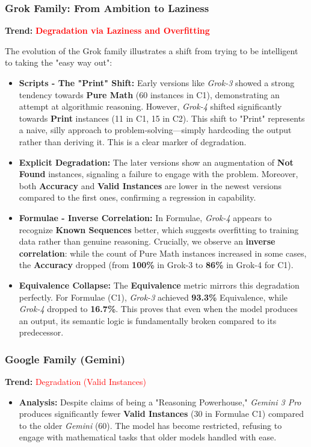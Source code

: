 \subsubsection{Grok Family: From Ambition to Laziness}
\textbf{Trend:} \textcolor{red}{\textbf{Degradation via Laziness and Overfitting}}

The evolution of the Grok family illustrates a shift from trying to be intelligent to taking the "easy way out":

\begin{itemize}
    \item \textbf{Scripts - The "Print" Shift:} 
    Early versions like \textit{Grok-3} showed a strong tendency towards \textbf{Pure Math} (60 instances in C1), demonstrating an attempt at algorithmic reasoning. However, \textit{Grok-4} \cite{xAI2025Grok4} shifted significantly towards \textbf{Print} instances (11 in C1, 15 in C2). This shift to "Print" represents a naive, silly approach to problem-solving—simply hardcoding the output rather than deriving it. This is a clear marker of degradation.
    
    \item \textbf{Explicit Degradation:} 
    The later versions show an augmentation of \textbf{Not Found} instances, signaling a failure to engage with the problem. Moreover, both \textbf{Accuracy} and \textbf{Valid Instances} are lower in the newest versions compared to the first ones, confirming a regression in capability.
    
    \item \textbf{Formulae - Inverse Correlation:} 
    In Formulae, \textit{Grok-4} appears to recognize \textbf{Known Sequences} better, which suggests overfitting to training data rather than genuine reasoning. Crucially, we observe an \textbf{inverse correlation}: while the count of Pure Math instances increased in some cases, the \textbf{Accuracy} dropped (from \textbf{100\%} in Grok-3 to \textbf{86\%} in Grok-4 for C1).
    
    \item \textbf{Equivalence Collapse:} 
    The \textbf{Equivalence} metric mirrors this degradation perfectly. For Formulae (C1), \textit{Grok-3} achieved \textbf{93.3\%} Equivalence, while \textit{Grok-4} dropped to \textbf{16.7\%}. This proves that even when the model produces an output, its semantic logic is fundamentally broken compared to its predecessor.
\end{itemize}

\subsubsection{Google Family (Gemini)}
\textbf{Trend:} \textcolor{red}{Degradation (Valid Instances)}
\begin{itemize}
    \item \textbf{Analysis:} Despite claims of being a "Reasoning Powerhouse," \textit{Gemini 3 Pro} produces significantly fewer \textbf{Valid Instances} (30 in Formulae C1) compared to the older \textit{Gemini} (60). The model has become restricted, refusing to engage with mathematical tasks that older models handled with ease.
\end{itemize}

